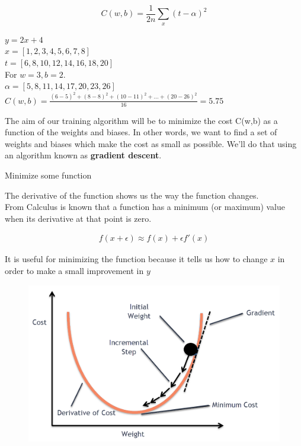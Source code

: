 \documentclass[10pt, compress]{beamer}
\begin{document}
\begin{frame}

  $$ C(w, b) = \frac{1}{2n}\sum_x (t-\alpha)^2$$

  $ y = 2x + 4$ \\
  $x = [1, 2, 3, 4, 5, 6, 7, 8]$ \\
  $t = [6, 8, 10, 12, 14, 16, 18, 20]$ \\

  For $w = 3, b = 2$. \\
  $\alpha = [5, 8, 11, 14, 17, 20, 23, 26]$ \\ \hfill \break
  $C(w, b) = \frac{(6-5)^2 + (8-8)^2 + (10-11)^2 + ... + (20-26)^2}{16} = 5.75$ \\ \hfill \break

  The aim of our training algorithm will be to minimize the cost C(w,b) as a function of the weights and biases. In other words, we want to find a set of weights and biases which make the cost as small as possible. We'll do that using an algorithm known as \textbf{gradient descent}.
\end{frame}

\begin{frame}
   Minimize some function \\

   \begin{multicols}{2}
     The derivative of the function shows us the way the function changes. \\
     From Calculus is known that a function has a minimum (or maximum) value when its derivative at that point is zero.

     \begin{eqnarray}
     f\left(x + \epsilon\right) \approx f\left(x\right) + \epsilon f'\left(x\right)
     \nonumber
     \end{eqnarray}

     It is useful for minimizing the function because it tells us how to change $x$ in order to make a small improvement in $y$


     \columnbreak
     \begin{figure}
       \includegraphics[width=1\linewidth]{imgs/gd_3}
     \end{figure}
  \end{multicols}
\end{frame}
\end{document}
